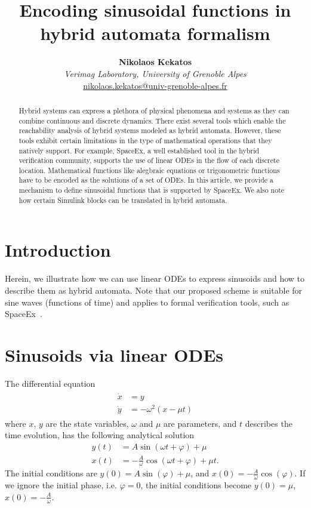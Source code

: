 \documentclass{article}
\title{\textbf{Encoding sinusoidal functions in hybrid automata formalism}}
\author{\textbf{Nikolaos Kekatos}\\ \emph{Verimag Laboratory, University of Grenoble Alpes}\\
 \href{mailto:nikolaos.kekatos@univ-grenoble-alpes.fr}{nikolaos.kekatos@univ-grenoble-alpes.fr}
 }
\date{}
\begin{document}
\maketitle
\begin{abstract}
    Hybrid systems can express a plethora of physical phenomena and systems as they can combine continuous and discrete dynamics. There exist several tools which enable the reachability analysis of hybrid systems modeled as hybrid automata. However, these tools exhibit certain limitations in the type of mathematical operations that they natively support. For example, SpaceEx, a well established tool in the hybrid verification community, supports the use of linear ODEs in the flow of each discrete location. Mathematical functions like alegbraic equations or trigonometric functions have to be encoded as the solutions of a set of ODEs. In this article, we provide a mechanism to define sinusoidal functions that is supported by SpaceEx. We also note how certain Simulink blocks can be translated in hybrid automata.
\end{abstract}
\section{Introduction}

Herein, we illustrate how we can use linear ODEs to express sinusoids and how to describe them as hybrid automata. Note that our proposed scheme is suitable for sine waves (functions of time) and applies to formal verification tools, such as SpaceEx~\cite{Frehse2011}.

\section{Sinusoids via linear ODEs}\label{sec2}

The differential equation
\begin{align}
\begin{aligned}
\dot{x} &= y \\
\dot{y} &= -\omega^2 (x-\mu t)
\end{aligned}
\label{eq1}
\end{align}
%
where $x$, $y$ are the state variables, $\omega$ and $\mu$ are parameters, and $t$ describes the time evolution, has the following analytical solution
\begin{subequations}
\begin{align}
y(t) &= A \sin(\omega t +\varphi) + \mu \\ 
x(t) &= -\frac{A}{\omega}\cos(\omega t + \varphi) + \mu t.
\end{align}
\end{subequations}
The initial conditions are %
$y(0)=A\sin(\varphi) + \mu$, and $x(0) =  -\frac{A}{\omega}\cos(\varphi)$. If we ignore the initial phase, i.e. $\varphi=0$, the initial conditions become $y(0) = \mu$, $x(0) = -\frac{A}{\omega}$.
\end{document}
